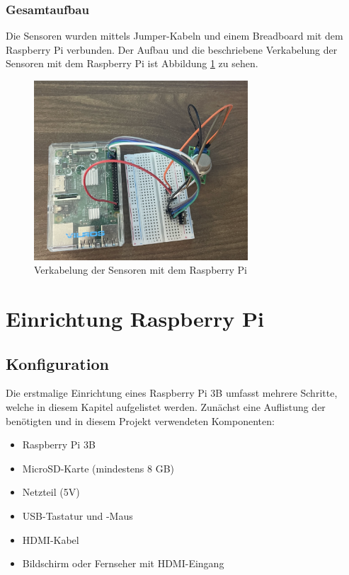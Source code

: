 \documentclass[conference]{IEEEtran}
\begin{document}
\subsubsection{Gesamtaufbau}
Die Sensoren wurden mittels Jumper-Kabeln und einem Breadboard mit dem Raspberry Pi verbunden. Der Aufbau und die beschriebene Verkabelung der Sensoren mit dem Raspberry Pi ist Abbildung \ref{aufbau} zu sehen.
\begin{figure}[htbp]
	\centerline{\includegraphics[width=80mm]{fig/aufbau.png}}
	\caption{Verkabelung der Sensoren mit dem Raspberry Pi}
	\label{aufbau}
\end{figure}

\section{Einrichtung Raspberry Pi}
\label{pi}
\subsection{Konfiguration}
Die erstmalige Einrichtung eines Raspberry Pi 3B umfasst mehrere Schritte, welche in diesem Kapitel aufgelistet werden. Zunächst eine Auflistung der benötigten und in diesem Projekt verwendeten Komponenten:
\begin{itemize}
	\item Raspberry Pi 3B
	\item MicroSD-Karte (mindestens 8 GB)
	\item Netzteil (5V)
	\item USB-Tastatur und -Maus
	\item HDMI-Kabel
	\item Bildschirm oder Fernseher mit HDMI-Eingang
\end{itemize}
\end{document}
